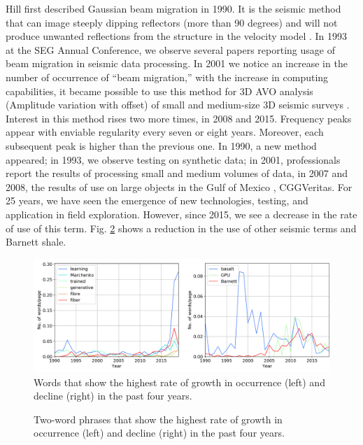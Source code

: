 \documentclass[geosciences,article,submit,moreauthors,pdftex]{Definitions/mdpi}
\begin{document}
Hill first described Gaussian beam migration in 1990. It is the seismic method that can image steeply dipping reflectors (more than 90 degrees) and will not produce unwanted reflections from the structure in the velocity model \citep{Hill1990}. In 1993 at the SEG Annual Conference, we observe several papers reporting usage of beam migration in seismic data processing. In 2001 we notice an increase in the number of occurrence of ``beam migration,'' with the increase in computing capabilities, it became possible to use this method for 3D AVO analysis (Amplitude variation with offset) of small and medium-size 3D seismic surveys \citep{Huang2001}. Interest in this method rises two more times, in 2008 and 2015. Frequency peaks appear with enviable regularity every seven or eight years. Moreover, each subsequent peak is higher than the previous one. In 1990, a new method appeared; in 1993, we observe testing on synthetic data; in 2001, professionals report the results of processing small and medium volumes of data, in 2007 and 2008, the results of use on large objects in the Gulf of Mexico \citep{Ting2008}, CGGVeritas. For 25 years, we have seen the emergence of new technologies, testing, and application in field exploration. However, since 2015, we see a decrease in the rate of use of this term. Fig. \ref{bigrams} shows a reduction in the use of other seismic terms and Barnett shale.


\begin{figure}[ht!]

\includegraphics[width=\textwidth]{si_grow_decl.png}
\caption{Words that show the highest rate of growth in occurrence (left) and decline (right) in the past four years.}
\label{sigrams}
\end{figure}

\begin{figure}[ht!]
\caption{Two-word phrases that show the highest rate of growth in occurrence (left) and decline (right) in the past four years.}
\label{bigrams}
\end{figure}
\end{document}
